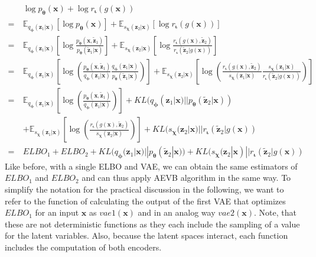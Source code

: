 \documentclass[12pt]{report}
\theoremstyle{definition}
\begin{document}
\begin{equation}
\begin{split}
 & \log p_{\pmb{\theta}}(\mathbf{x}) + \log r_{\mathbf{\iota}}(g(\mathbf{x}))   \\
	= \ & \mathbb{E}_{q_{\pmb{\phi}}(\mathbf{z}_1|\mathbf{x})}\left[\log p_{\pmb{\theta}}(\mathbf{x})\right] + \mathbb{E}_{s_{\mathbf{\chi}}(\mathbf{z}_2|\mathbf{x})}\left[\log r_{\mathbf{\iota}}(g(\mathbf{x}))\right] \\
	= \ & \mathbb{E}_{q_{\pmb{\phi}}(\mathbf{z}_1|\mathbf{x})}\left[ \log \frac{p_{\pmb{\theta}}(\mathbf{x}, \tilde{\mathbf{z}}_1)}{p_{\pmb{\theta}}(\tilde{\mathbf{z}}_1|\mathbf{x})} \right]
	+ \mathbb{E}_{s_{\mathbf{\chi}}(\mathbf{z}_2|\mathbf{x})}\left[ \log \frac{r_{\mathbf{\iota}}(g(\mathbf{x}), \tilde{\mathbf{z}}_2)}{r_{\mathbf{\iota}}(\tilde{\mathbf{z}}_2|g(\mathbf{x}))} \right] \\
	= \ & \mathbb{E}_{q_{\pmb{\phi}}(\mathbf{z}_1|\mathbf{x})}\left[ \log \left( \frac{p_{\pmb{\theta}}(\mathbf{x}, \tilde{\mathbf{z}}_1)}{q_{\pmb{\phi}}(\mathbf{z}_1|\mathbf{x})}\frac{q_{\pmb{\phi}}(\mathbf{z}_1|\mathbf{x})}{p_{\pmb{\theta}}(\tilde{\mathbf{z}}_1|\mathbf{x})}\right) \right]
	+ \mathbb{E}_{s_{\mathbf{\chi}}(\mathbf{z}_2|\mathbf{x})}\left[ \log \left( \frac{r_{\mathbf{\iota}}(g(\mathbf{x}), \tilde{\mathbf{z}}_2)}{s_{\mathbf{\chi}}(\mathbf{z}_1|\mathbf{x})}\frac{s_{\mathbf{\chi}}(\mathbf{z}_1|\mathbf{x})}{r_{\mathbf{\iota}}(\tilde{\mathbf{z}}_2|g(\mathbf{x}))} \right) \right] \\
	= \ & \mathbb{E}_{q_{\pmb{\phi}}(\mathbf{z}_1|\mathbf{x})}\left[ \log\left(\frac{p_{\pmb{\theta}}(\mathbf{x}, \tilde{\mathbf{z}}_1)}{q_{\pmb{\phi}}(\mathbf{z}_1|\mathbf{x})}\right) \right] + KL(q_{\pmb{\phi}}(\mathbf{z}_1|\mathbf{x}) || p_{\pmb{\theta}}(\tilde{\mathbf{z}}_2| \mathbf{x})) \\
	& + \mathbb{E}_{s_{\mathbf{\chi}}(\mathbf{z}_1|\mathbf{x})}\left[ \log\left(\frac{r_{\mathbf{\iota}}(g(\mathbf{x}), \tilde{\mathbf{z}}_2)}{s_{\mathbf{\chi}}(\mathbf{z}_2|\mathbf{x})}\right) \right] + KL(s_{\mathbf{\chi}}(\mathbf{z}_2|\mathbf{x}) || r_{\mathbf{\iota}}(\tilde{\mathbf{z}}_2| g(\mathbf{x})) \\
= \ & ELBO_1 + ELBO_2 + KL(q_{\pmb{\phi}}(\mathbf{z}_1|\mathbf{x}) || p_{\pmb{\theta}}(\tilde{\mathbf{z}}_2| \mathbf{x})) + KL(s_{\mathbf{\chi}}(\mathbf{z}_2|\mathbf{x}) || r_{\mathbf{\iota}}(\tilde{\mathbf{z}}_2| g(\mathbf{x}))
\end{split}
\end{equation}
Like before, with a single ELBO and VAE, we can obtain the same estimators of $ELBO_1$ and $ELBO_2$ and can thus apply AEVB algorithm in the same way. To simplify the notation for the practical discussion in the following, we want to refer to the function of calculating the output of the first VAE that optimizes $ELBO_1$ for an input $\mathbf{x}$ as $vae1(\mathbf{x})$ and in an analog way $vae2(\mathbf{x})$. Note, that these are not deterministic functions as they each include the sampling of a value for the latent variables. Also, because the latent spaces interact, each function includes the computation of both encoders.
\end{document}
